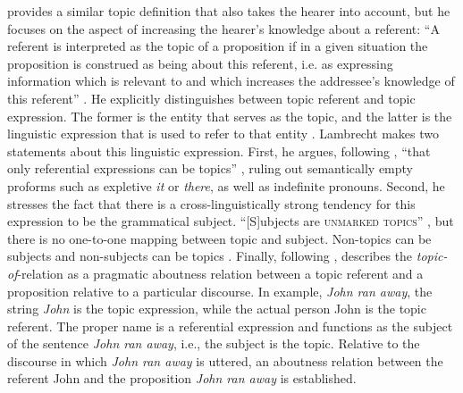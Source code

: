 \citet{lambrecht1994} provides a similar topic definition that also takes the hearer into account, but he focuses on the aspect of increasing the hearer's knowledge about a referent: 
``A referent is interpreted as the topic of a proposition if in a given situation the proposition is construed as being about this referent, i.e. as expressing information which is relevant to and which increases the addressee's knowledge of this referent'' \citep[131]{lambrecht1994}.
He explicitly distinguishes between topic referent and topic expression.
The former is the entity that serves as the topic, and the latter is the linguistic expression that is used to refer to that entity \citep[127--128]{lambrecht1994}.
Lambrecht makes two statements about this linguistic expression.
First, he argues, following \citet[67]{reinhart1981}, ``that only referential expressions can be topics'' \citep[156]{lambrecht1994}, ruling out semantically empty proforms such as expletive  \textit{it} or \textit{there}, as well as indefinite pronouns.  
Second, he stresses the fact that there is a cross\hyp linguistically strong tendency for this expression to be the grammatical subject.
``[S]ubjects are \textsc{unmarked topics}'' \citep[132, original emphasis]{lambrecht1994}, but there is no one-to-one mapping between topic and subject.
Non-topics can be subjects and non-subjects can be topics \citep[see also][62]{reinhart1981}.
Finally, following \citet{reinhart1981}, \citet[127]{lambrecht1994} describes the \textit{topic-of}-relation as a pragmatic aboutness relation between a topic referent and a proposition relative to a particular discourse. 
In  example, \textit{John ran away}, the string \textit{John} is the topic expression, while the actual person John is the topic referent.
The proper name is a referential expression and functions as the subject of the sentence \textit{John ran away}, i.e., the subject is the topic.
Relative to the discourse in which  \textit{John ran away} is uttered, an aboutness relation between the referent John and the proposition \textit{John ran away} is established.

